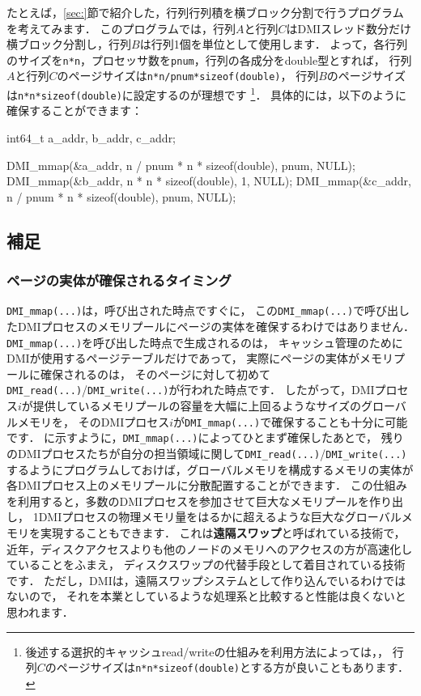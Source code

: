 \documentclass[report,12pt]{jsbook}
\begin{document}
たとえば，\ref{sec:}節で紹介した，行列行列積を横ブロック分割で行うプログラムを考えてみます．
このプログラムでは，行列$A$と行列$C$はDMIスレッド数分だけ横ブロック分割し，行列$B$は行列1個を単位として使用します．
よって，各行列のサイズを\texttt{n*n}，プロセッサ数を\texttt{pnum}，行列の各成分をdouble型とすれば，
行列$A$と行列$C$のページサイズは\texttt{n*n/pnum*sizeof(double)}，
行列$B$のページサイズは\texttt{n*n*sizeof(double)}に設定するのが理想です
\footnote{後述する選択的キャッシュread/writeの仕組みを利用方法によっては，，
行列$C$のページサイズは\texttt{n*n*sizeof(double)}とする方が良いこともあります．}．
具体的には，以下のように確保することができます：
\begin{code}
int64_t a_addr, b_addr, c_addr;

DMI_mmap(&a_addr, n / pnum * n * sizeof(double), pnum, NULL);
DMI_mmap(&b_addr, n * n * sizeof(double), 1, NULL);
DMI_mmap(&c_addr, n / pnum * n * sizeof(double), pnum, NULL);
\end{code}

\subsection{補足}

\subsubsection{ページの実体が確保されるタイミング}

\texttt{DMI\_mmap(...)}は，呼び出された時点ですぐに，
この\texttt{DMI\_mmap(...)}で呼び出したDMIプロセスのメモリプールにページの実体を確保するわけではありません．
\texttt{DMI\_mmap(...)}を呼び出した時点で生成されるのは，
キャッシュ管理のためにDMIが使用するページテーブルだけであって，
実際にページの実体がメモリプールに確保されるのは，
そのページに対して初めて\texttt{DMI\_read(...)}/\texttt{DMI\_write(...)}が行われた時点です．
したがって，DMIプロセス$i$が提供しているメモリプールの容量を大幅に上回るようなサイズのグローバルメモリを，
そのDMIプロセス$i$が\texttt{DMI\_mmap(...)}で確保することも十分に可能です．
に示すように，\texttt{DMI\_mmap(...)}によってひとまず確保したあとで，
残りのDMIプロセスたちが自分の担当領域に関して\texttt{DMI\_read(...)}/\texttt{DMI\_write(...)}
するようにプログラムしておけば，グローバルメモリを構成するメモリの実体が各DMIプロセス上のメモリプールに分散配置することができます．
この仕組みを利用すると，多数のDMIプロセスを参加させて巨大なメモリプールを作り出し，
1DMIプロセスの物理メモリ量をはるかに超えるような巨大なグローバルメモリを実現することもできます．
これは\textbf{遠隔スワップ}と呼ばれている技術で，
近年，ディスクアクセスよりも他のノードのメモリへのアクセスの方が高速化していることをふまえ，
ディスクスワップの代替手段として着目されている技術です．
ただし，DMIは，遠隔スワップシステムとして作り込んでいるわけではないので，
それを本業としているような処理系と比較すると性能は良くないと思われます．
\end{document}
